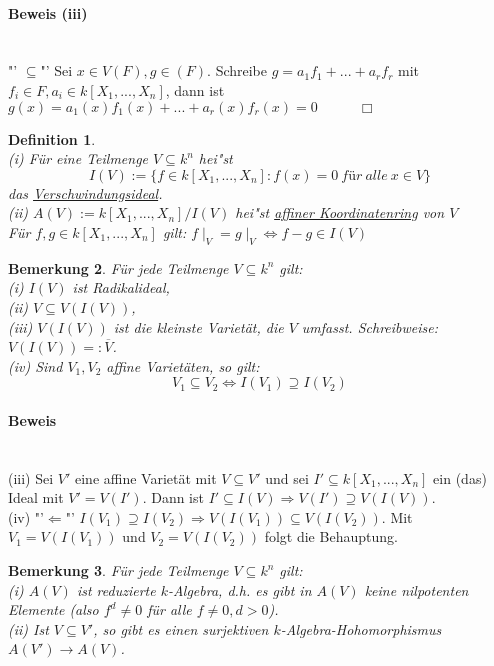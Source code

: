 \documentclass[a4paper,12pt]{report}
\theoremstyle{break}
\newtheorem{Def}{Definition}[chapter]
\newtheorem{Bem}[Def]{Bemerkung}
\theoremstyle{nonumberbreak}
\theoremstyle{nonumberplain}
\begin{document}
\paragraph{Beweis (iii)}~\\
"' $\subseteq$"' Sei $x\in V(F), g\in (F)$. Schreibe $g=a_1f_1+...+a_rf_r$ mit $f_i \in F, a_i \in k[X_1,...,X_n]$, dann ist $g(x)=a_1(x)f_1(x)+...+a_r(x)f_r(x)=0~~~~~~~~~~~~~\Box$
\begin{Def}~\\
(i) Für eine Teilmenge $V\subseteq k^n$ hei"st
$$I(V):=\{f\in k[X_1,...,X_n]: f(x)=0 ~für~alle~ x \in V\}$$
das \underline{Verschwindungsideal}.\\
(ii) $A(V):= k[X_1,...,X_n]/I(V)$ hei"st \underline{affiner Koordinatenring} von $V$\\
Für $f,g\in k[X_1,...,X_n]$ gilt: $f\mid_V = g\mid_V\Leftrightarrow f-g \in I(V)$
\end{Def}
\begin{Bem}
Für jede Teilmenge $V\subseteq k^n$ gilt:\\
(i) $I(V)$ ist Radikalideal,\\
(ii) $V\subseteq V(I(V))$,\\
(iii) $V(I(V))$ ist die kleinste Varietät, die $V$ umfasst. Schreibweise: $V(I(V))=: \overline{V}$.\\
(iv) Sind $V_1, V_2$ affine Varietäten, so gilt:
$$V_1\subseteq V_2 \Leftrightarrow I(V_1)\supseteq I(V_2)$$
\end{Bem}
\paragraph{Beweis}~\\
(iii) Sei $V'$ eine affine Varietät mit $V\subseteq V'$ und sei $I'\subseteq k[X_1,...,X_n]$ ein (das) Ideal mit $V'=V(I')$. Dann ist $I'\subseteq I(V)\Rightarrow V(I')\supseteq V(I(V))$.\\
(iv) "'$\Leftarrow$"' $I(V_1)\supseteq I(V_2)\Rightarrow V(I(V_1))\subseteq V(I(V_2))$. Mit $V_1 = V(I(V_1))$ und $V_2= V(I(V_2))$ folgt die Behauptung.
\begin{Bem}
Für jede Teilmenge $V\subseteq k^n$ gilt:\\
(i) $A(V)$ ist reduzierte $k$-Algebra, d.h. es gibt in $A(V)$ keine nilpotenten Elemente (also $f^d\neq 0$ für alle $f \neq 0, d>0$).\\
(ii) Ist $V\subseteq V'$, so gibt es einen surjektiven $k$-Algebra-Hohomorphismus $A(V')\longrightarrow A(V)$.
\end{Bem}
\end{document}
